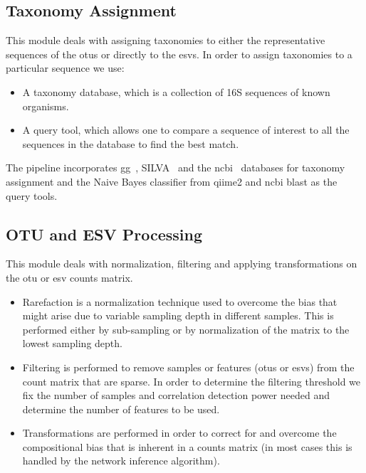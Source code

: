   \subsection*{Taxonomy Assignment}
  \vspace{-5mm}
  This module deals with assigning taxonomies to either the representative sequences of the \ac{otu}s or directly to the \ac{esv}s.
  In order to assign taxonomies to a particular sequence we use:
  \begin{itemize}
    \item A taxonomy database, which is a collection of 16S sequences of known organisms.
    \item A query tool, which allows one to compare a sequence of interest to all the sequences in the database to find the best match.
  \end{itemize}
  The pipeline incorporates \ac{gg}~\cite{DeSantis2006}, SILVA~\cite{Quast2012} and the \ac{ncbi}~\cite{Sayers2009} databases for taxonomy assignment and the Naive Bayes classifier from \ac{qiime2} and \ac{ncbi} blast as the query tools.

  \subsection*{OTU and ESV Processing}
  \vspace{-5mm}
  This module deals with normalization, filtering and applying transformations on the \ac{otu} or \ac{esv} counts matrix.
  \begin{itemize}
    \item Rarefaction is a normalization technique used to overcome the bias that might arise due to variable sampling depth in different samples. This is performed either by sub-sampling or by normalization of the matrix to the lowest sampling depth.
    \item Filtering is performed to remove samples or features (\ac{otu}s or \ac{esv}s) from the count matrix that are sparse. In order to determine the filtering threshold we fix the number of samples and correlation detection power needed  and determine the number of features to be used.
    \item Transformations are performed in order to correct for and overcome the compositional bias that is inherent in a counts matrix (in most cases this is handled by the network inference algorithm).
  \end{itemize}

